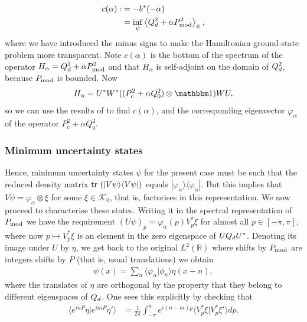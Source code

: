 \begin{align*}
  c(\alpha) :&= -b^*(-\alpha)\\
             &= \inf_\psi \left\langle{Q_d^2 + \alpha P_{\mathrm{mod}}^2}\right\rangle_{\psi},
\end{align*}
where we have introduced the minus signs to make the Hamiltonian ground-state problem more transparent. Note $c(\alpha)$ is the bottom of the spectrum of the operator $H_\alpha=Q_d^2+\alpha P_{\mathrm{mod}}^2$ and that $H_\alpha$ is self-adjoint on the domain of $Q_d^2$, because $P_{\mathrm{mod}}$ is bounded. Now
$$
H_\alpha = U^*W^*((P_c^2+\alpha Q_0^2)\otimes \id)WU,
$$
so we can use the results of \cite{sharp-ur-num-angle} to find $c(\alpha)$, and the corresponding eigenvector $\varphi_\alpha$ of the operator $P_c^2+\alpha Q_0^2$.

\subsubsection{Minimum uncertainty states}

Hence, minimum uncertainty states $\psi$ for the present case must be such that the reduced density matrix $\tr{|V\psi\rangle\langle V\psi|}$ equals $|\varphi_\alpha\rangle\langle \varphi_\alpha|$. But this implies that $V\psi =\varphi_\alpha\otimes \xi$ for some $\xi\in \mathcal K_0$, that is, factorises in this representation. We now proceed to characterise these states. Writing it in the spectral representation of $P_{\mathrm{mod}}$ we have the requirement
$(U\psi)_p = \varphi_\alpha(p) V^*_p\xi$
for almost all $p\in [-\pi,\pi]$, where now $p\mapsto V^*_p\xi$ is an element in the zero eigenspace of $UQ_d U^*$. Denoting its image under $U$ by $\eta$, we get back to the original $L^2(\mathbb R)$ where shifts by $P_{\mathrm{mod}}$ are integers shifts by $P$ (that is, usual translations) we obtain
\begin{align}\label{minURC}
\psi(x) = \sum_n \langle \varphi_\alpha|\phi_n\rangle \eta(x-n),
\end{align}
where the translates of $\eta$ are orthogonal by the property that they belong to different eigenspaces of $Q_d$. One sees this explicitly by checking that
\begin{align}\label{orth}
\langle e^{inP}\eta |e^{imP}\eta'\rangle & = \frac{1}{2\pi} \int_{-\pi}^{\pi} e^{i(n-m)p}\langle V^*_p\xi|V^*_{p}\xi'\rangle dp.
\end{align}

